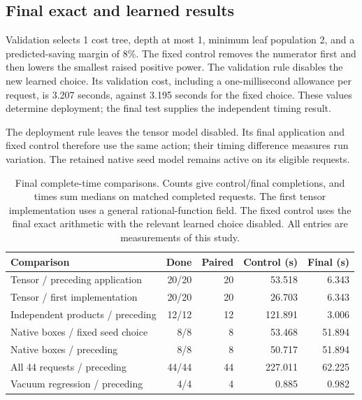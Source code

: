 \subsection{Final exact and learned results}
Validation selects 1 cost tree, depth at most 1, minimum leaf population 2, and a predicted-saving margin of 8\%. The fixed control removes the numerator first and then lowers the smallest raised positive power. The validation rule disables the new learned choice. Its validation cost, including a one-millisecond allowance per request, is 3.207 seconds, against 3.195 seconds for the fixed choice. These values determine deployment; the final test supplies the independent timing result.

The deployment rule leaves the tensor model disabled. Its final application and fixed control therefore use the same action; their timing difference measures run variation. The retained native seed model remains active on its eligible requests.

\begin{table}[!htbp]\centering\small
\caption{Final complete-time comparisons. Counts give control/final completions, and times sum medians on matched completed requests. The first tensor implementation uses a general rational-function field. The fixed control uses the final exact arithmetic with the relevant learned choice disabled. All entries are measurements of this study.}
\label{tab:notes-tensor-results}
\begin{tabularx}{\linewidth}{@{}Yrrrr@{}}\toprule
Comparison & Done & Paired & Control (s) & Final (s)\\\midrule
Tensor / preceding application & 20/20 & 20 & 53.518 & 6.343 \\
Tensor / first implementation & 20/20 & 20 & 26.703 & 6.343 \\
Independent products / preceding & 12/12 & 12 & 121.891 & 3.006 \\
Native boxes / fixed seed choice & 8/8 & 8 & 53.468 & 51.894 \\
Native boxes / preceding & 8/8 & 8 & 50.717 & 51.894 \\
All 44 requests / preceding & 44/44 & 44 & 227.011 & 62.225 \\
Vacuum regression / preceding & 4/4 & 4 & 0.885 & 0.982 \\
\bottomrule\end{tabularx}\end{table}

